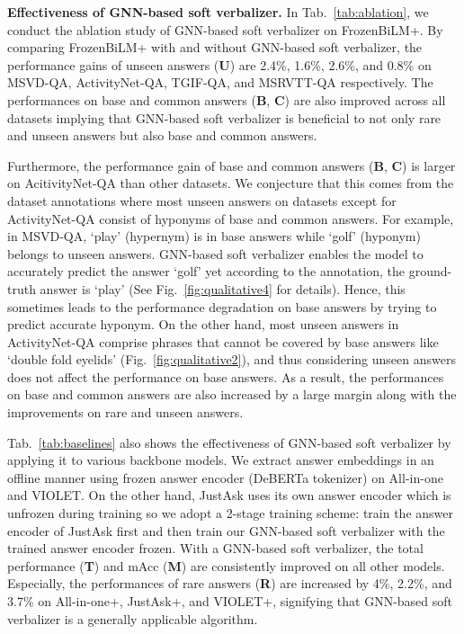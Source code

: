 \documentclass[10pt,twocolumn,letterpaper]{article}
\begin{document}
\noindent \textbf{Effectiveness of GNN-based soft verbalizer.}
In Tab.~\ref{tab:ablation}, we conduct the ablation study of GNN-based soft verbalizer on FrozenBiLM+.
By comparing FrozenBiLM+ with and without GNN-based soft verbalizer, the performance gains of unseen answers (\textbf{U}) are 2.4\%, 1.6\%, 2.6\%, and 0.8\% on MSVD-QA, ActivityNet-QA, TGIF-QA, and MSRVTT-QA respectively.
The performances on base and common answers (\textbf{B}, \textbf{C}) are also improved across all datasets implying that GNN-based soft verbalizer is beneficial to not only rare and unseen answers but also base and common answers.

Furthermore, the performance gain of base and common answers (\textbf{B}, \textbf{C}) is larger on AcitivityNet-QA than other datasets.
We conjecture that this comes from the dataset annotations where most unseen answers on datasets except for ActivityNet-QA consist of hyponyms of base and common answers.
For example, in MSVD-QA, `play’ (hypernym) is in base answers while `golf’ (hyponym) belongs to unseen answers.
GNN-based soft verbalizer enables the model to accurately predict the answer `golf' yet according to the annotation, the ground-truth answer is `play' (See Fig.~\ref{fig:qualitative4} for details).
Hence, this sometimes leads to the performance degradation on base answers by trying to predict accurate hyponym.
On the other hand, most unseen answers in ActivityNet-QA comprise phrases that cannot be covered by base answers like `double fold eyelids' (Fig.~\ref{fig:qualitative2}), and thus considering unseen answers does not affect the performance on base answers.
As a result, the performances on base and common answers are also increased by a large margin along with the improvements on rare and unseen answers.

Tab.~\ref{tab:baselines} also shows the effectiveness of GNN-based soft verbalizer by applying it to various backbone models.
We extract answer embeddings in an offline manner using frozen answer encoder (DeBERTa tokenizer) on All-in-one and VIOLET.
On the other hand, JustAsk uses its own answer encoder which is unfrozen during training so we adopt a 2-stage training scheme: train the answer encoder of JustAsk first and then train our GNN-based soft verbalizer with the trained answer encoder frozen.
With a GNN-based soft verbalizer, the total performance (\textbf{T}) and mAcc (\textbf{M}) are consistently improved on all other models.
Especially, the performances of rare answers (\textbf{R}) are increased by 4\%, 2.2\%, and 3.7\% on All-in-one+, JustAsk+, and VIOLET+, signifying that GNN-based soft verbalizer is a generally applicable algorithm.
\end{document}
